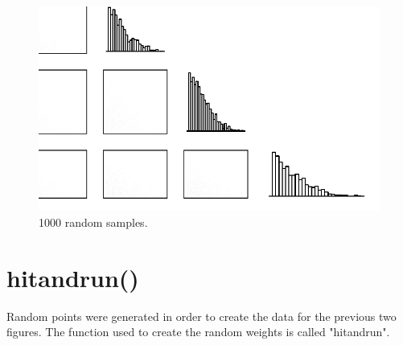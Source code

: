 \documentclass{article}\usepackage{graphicx, color}
\makeatletter
\def\maxwidth{ %
  \ifdim\Gin@nat@width>\linewidth
    \linewidth
  \else
    \Gin@nat@width
  \fi
}
\newenvironment{knitrout}{}{} %
\makeatother
\begin{document}
\begin{figure}[H]
\begin{knitrout}
\color{fgcolor}
\includegraphics[width=\maxwidth]{figure/fiveByFiveGrid} 

\end{knitrout}

\caption{1000 random samples.}
\end{figure}

\section*{hitandrun()}

Random points were generated in order to create the data for the previous two figures. The function used to create the random weights is called "hitandrun".
\end{document}
